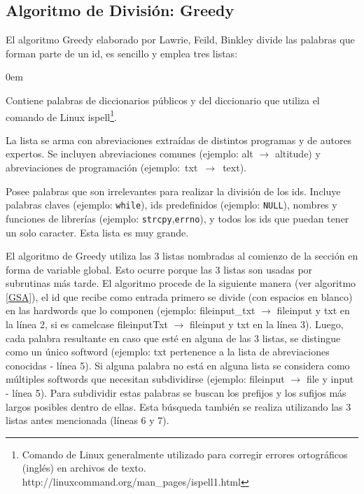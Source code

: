 \documentclass[a4paper,12pt]{report}
\begin{document}
\subsection{Algoritmo de División: Greedy}

El algoritmo Greedy elaborado por Lawrie, Feild, Binkley \cite{DLFB06,FBL06,HDD06,LFBEX07,EHPV09} divide las palabras que forman parte de un id, es sencillo y emplea tres listas:
\begin{description}
\itemsep0em%
\item[Palabras de diccionarios:] Contiene palabras de diccionarios públicos y del diccionario que utiliza el comando de Linux \textsf{ispell}\footnote[1]{Comando de Linux generalmente utilizado para corregir errores ortográficos (inglés) en archivos de texto. http://linuxcommand.org/man\_pages/ispell1.html}.

\item[Abreviaciones conocidas:] La lista se arma con abreviaciones extraídas de distintos programas y de autores expertos. Se incluyen abreviaciones comunes (ejemplo: \textsf{alt} $\rightarrow$ \textsf{altitude}) y abreviaciones de programación \mbox{(ejemplo: \textsf{txt} $\rightarrow$ \textsf{text}).}

\item[Palabras excluyentes (stop list):] Posee palabras que son irrelevantes para realizar la división de los ids. Incluye palabras claves (ejemplo: \texttt{while}), ids predefinidos (ejemplo: \texttt{NULL}), nombres y funciones de librerías (ejemplo: \texttt{strcpy},\texttt{errno}), y todos los ids que puedan tener un solo caracter. Esta lista es muy grande.
\end{description}

El algoritmo de Greedy utiliza las 3 listas nombradas al comienzo de la sección en forma de variable global. Esto ocurre porque las 3 listas son usadas por subrutinas más tarde. El algoritmo procede de la siguiente manera (ver algoritmo \ref{GSA}), el id que recibe como entrada primero se divide (con espacios en blanco) en las hardwords que lo componen (ejemplo: \textsf{fileinput\_txt} $\rightarrow$ \mbox{\textsf{fileinput}} y \textsf{txt} en la línea 2, si es camelcase \textsf{fileinputTxt} $\rightarrow$ \textsf{fileinput} y \textsf{txt} en la línea 3). Luego, cada palabra resultante en caso que esté en alguna de las 3 listas, se distingue como un único softword (ejemplo: \textsf{txt} pertenence a la lista de abreviaciones conocidas - línea 5). Si alguna palabra no está en alguna lista se considera como múltiples softwords que necesitan subdividirse (ejemplo: \textsf{fileinput} $\rightarrow$ \textsf{file} y \textsf{input} - línea 5).
Para subdividir estas palabras se buscan los prefijos y los sufijos más largos posibles dentro de ellas. Esta búsqueda también se realiza utilizando las 3 listas antes mencionada (líneas 6 y 7).
\end{document}

